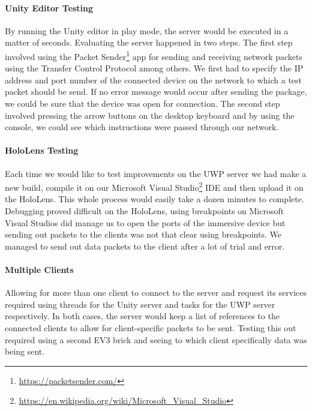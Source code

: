 \paragraph{Unity Editor Testing}
By running the Unity editor in play mode, the server would be executed in a matter of seconds. Evaluating the server happened in two steps.
The first step involved using the Packet Sender\footnote{\protect\url{https://packetsender.com/}} app for sending and receiving network packets using the Transfer Control Protocol among others. We first had to specify the IP address and port number of the connected device on the network to which a test packet should be send. If no error message would occur after sending the package, we could be sure that the device was open for connection.
The second step involved pressing the arrow buttons on the desktop keyboard and by using the console, we could see which instructions were passed through our network. 

\paragraph{HoloLens Testing}
Each time we would like to test improvements on the UWP server we had make a new build, compile it on our Microsoft Visual Studio\footnote{\protect\url{https://en.wikipedia.org/wiki/Microsoft_Visual_Studio}} IDE and then upload it on the HoloLens. This whole process would easily take a dozen minutes to complete. Debugging proved difficult on the HoloLens, using breakpoints on Microsoft Visual Studios did manage us to open the ports of the immersive device but sending out packets to the clients was not that clear using breakpoints. We managed to send out data packets to the client after a lot of trial and error.

\paragraph{Multiple Clients}
Allowing for more than one client to connect to the server and request its services required using threads for the Unity server and tasks for the UWP server respectively. In both cases, the server would keep a list of references to the connected clients to allow for client-specific packets to be sent. Testing this out required using a second EV3 brick and seeing to which client specifically data was being sent.


